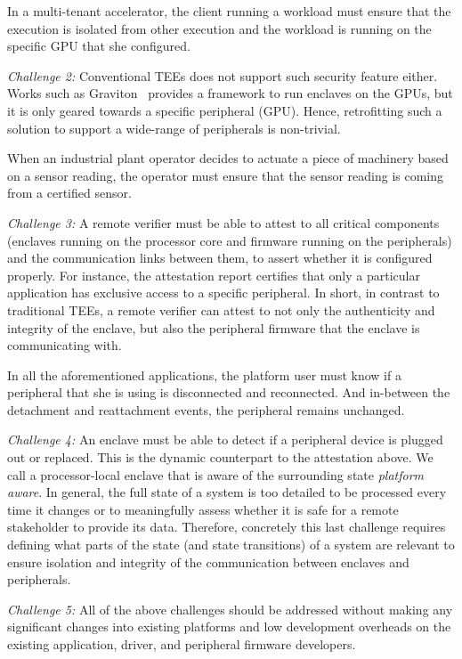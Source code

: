  In a multi-tenant accelerator, the client running a workload must ensure that the execution is isolated from other execution and the workload is running on the specific GPU that she configured. 

\emph{Challenge 2:} Conventional TEEs does not support such security feature either. Works such as Graviton~\cite{volos2018graviton} provides a framework to run enclaves on the GPUs, but it is only geared towards a specific peripheral (GPU). Hence, retrofitting such a solution to support a wide-range of peripherals is non-trivial. 

 When an industrial plant operator decides to actuate a piece of machinery based on a sensor reading, the operator must ensure that the sensor reading is coming from a certified sensor.

\emph{Challenge 3:} A remote verifier must be able to attest to all critical components (enclaves running on the processor core and firmware running on the peripherals) and the communication links between them, to assert whether it is configured properly. For instance, the attestation report certifies that only a particular application has exclusive access to a specific peripheral. In short, in contrast to traditional TEEs, a remote verifier can attest to not only the authenticity and integrity of the enclave, but also the peripheral firmware that the enclave is communicating with.

 In all the aforementioned applications, the platform user must know if a peripheral that she is using is disconnected and reconnected. And in-between the detachment and reattachment events, the peripheral remains unchanged. 

\emph{Challenge 4:} An enclave must be able to detect if a peripheral device is plugged out or replaced. This is the dynamic counterpart to the attestation above. We call a processor-local enclave that is aware of the surrounding state \emph{platform aware}. In general, the full state of a system is too detailed to be processed every time it changes or to meaningfully assess whether it is safe for a remote stakeholder to provide its data. Therefore, concretely this last challenge requires defining what parts of the state (and state transitions) of a system are relevant to ensure isolation and integrity of the communication between enclaves and peripherals.


 \emph{Challenge 5:} All of the above challenges should be addressed without making any significant changes into existing platforms and low development overheads on the existing application, driver, and peripheral firmware developers.



